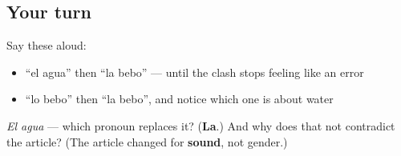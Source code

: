 \subsection*{Your turn}
Say these aloud:

\begin{itemize}
\raggedright
  \item \textquotedblleft{}el agua\textquotedblright{} then \textquotedblleft{}la bebo\textquotedblright{} — until the clash stops feeling like an error
  \item \textquotedblleft{}lo bebo\textquotedblright{} then \textquotedblleft{}la bebo\textquotedblright{}, and notice which one is about water
\end{itemize}

\begin{tcolorbox}[breakable,colback=teal!4,colframe=teal!35!black,title={Before you move on}]
\emph{El agua} — which pronoun replaces it? (\textbf{La}.) And why does that not contradict the article? (The article changed for \textbf{sound}, not gender.)
\end{tcolorbox}
